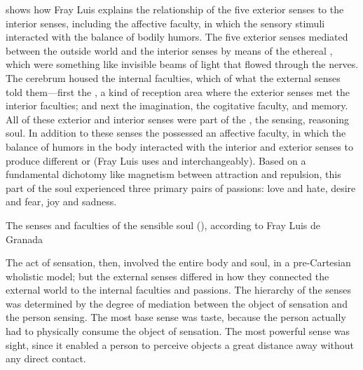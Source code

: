  shows how Fray Luis explains the relationship 
of the five exterior senses to the interior senses, including the affective 
faculty, in which the sensory stimuli interacted with the balance of bodily 
humors.%
    \Autocite
    [pt.~I, ch.~27--35, pp.~439--494]{LuisdeGranada-Balcells:SimboloPtI}
The five exterior senses mediated between the outside world and the interior 
senses by means of the ethereal , which were something
like invisible beams of light that flowed through the nerves.
The cerebrum housed the internal faculties, which  of what 
the external senses told them---first the , a kind of 
reception area where the exterior senses met the interior faculties; and next 
the imagination, the cogitative faculty, and memory.
All of these exterior and interior senses were part of the , the sensing, reasoning soul.
In addition to these senses the  possessed an affective 
faculty, in which the balance of humors in the body interacted with the 
interior and exterior senses to produce different  or 
 (Fray Luis uses  and  
interchangeably).
Based on a fundamental dichotomy like magnetism between attraction and repulsion, 
this  part of the soul experienced three primary pairs of 
passions: love and hate, desire and fear, joy and sadness.

\begin{table}
    \caption{The senses and faculties of the sensible soul (), according to Fray Luis de Granada}
    \label{table:senses-fray-luis}
\end{table}

The act of sensation, then, involved the entire body and soul, in a 
pre-Cartesian wholistic model; but the external senses differed in how they 
connected the external world to the internal faculties and passions.
The hierarchy of the senses was determined by the degree of mediation between 
the object of sensation and the person sensing.
The most base sense was taste, because the person actually had to physically 
consume the object of sensation.
The most powerful sense was sight, since it enabled a person to perceive 
objects a great distance away without any direct contact.

